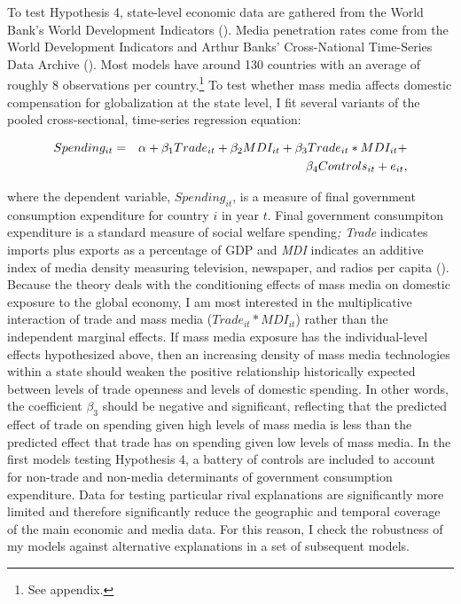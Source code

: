 \documentclass[12pt]{report}
\begin{document}
To test Hypothesis 4, state-level economic data are gathered from the World Bank's World Development
Indicators (\citealt{WorldDevelopmentIn:2012wl}). Media penetration rates come from the World
Development Indicators and Arthur Banks' Cross-National Time-Series Data Archive
(\citealt{CrossNationalTime:td,WorldDevelopmentIn:2012wl}). Most models have around 130 countries
with an average of roughly 8 observations per country.\footnote{See appendix. } To test
whether mass media affects domestic compensation for globalization at the state level, I fit several
variants of the pooled cross-sectional, time-series regression equation:

\begin{eqnarray} Spending_{it}& =
&\alpha+\beta_{1}Trade_{it}+\beta_{2}MDI_{it}+\beta_{3}Trade_{it}*MDI_{it}+ \notag \\ &  &
\beta_{4}Controls_{it}+e_{it}, \end{eqnarray}

\noindent where the dependent variable, $Spending_{it}$, is a measure of final government
consumption expenditure for country $i$ in year $t$. Final government consumpiton expenditure is a
standard measure of social welfare spending\emph{; Trade} indicates imports plus exports as a
percentage of GDP and \emph{MDI} indicates an additive index of media density measuring television,
newspaper, and radios per capita (\citealt{Camber:2013ul}). Because the theory deals with the
conditioning effects of mass media on domestic exposure to the global economy, I am most interested
in the multiplicative interaction of trade and mass media ($Trade_{it}*MDI_{it}$) rather than the
independent marginal effects. If mass media exposure has the individual-level effects hypothesized
above, then an increasing density of mass media technologies within a state should weaken the
positive relationship historically expected between levels of trade openness and levels of domestic
spending. In other words, the coefficient $\beta_{3}$ should be negative and significant, reflecting
that the predicted effect of trade on spending given high levels of mass media is less than the
predicted effect that trade has on spending given low levels of mass media. In the first models
testing Hypothesis 4, a battery of controls are included to account for non-trade and non-media
determinants of government consumption expenditure. Data for testing particular rival explanations
are significantly more limited and therefore significantly reduce the geographic and temporal
coverage of the main economic and media data. For this reason, I check the robustness of my models
against alternative explanations in a set of subsequent models.
\end{document}
